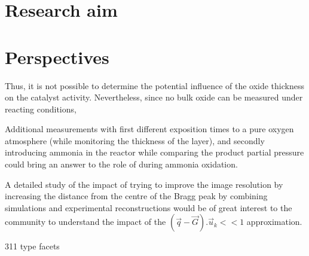 \section{Research aim}


\section{Perspectives}

Thus, it is not possible to determine the potential influence of the oxide thickness on the catalyst activity.
Nevertheless, since no bulk oxide can be measured under reacting conditions,

Additional measurements with first different exposition times to a pure oxygen atmosphere (while monitoring the thickness of the  layer), and secondly introducing ammonia in the reactor while comparing the product partial pressure could bring an answer to the role of  during ammonia oxidation.

A detailed study of the impact of trying to improve the image resolution by increasing the distance from the centre of the Bragg peak by combining simulations and experimental reconstructions would be of great interest to the community to understand the impact of the $(\vec{q}-\vec{G}).\vec{u}_k<<1$ approximation.


311 type facets